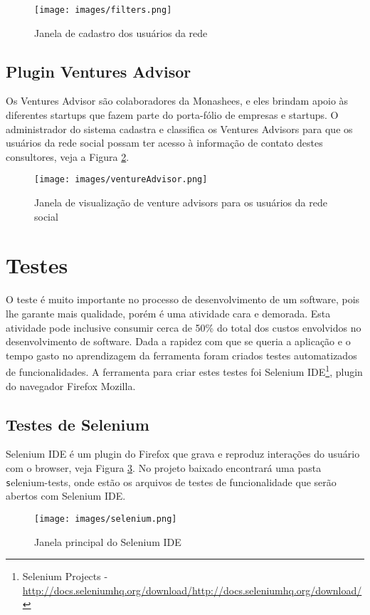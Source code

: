 \documentclass[12pt, letterpaper, onecolumn]{article}
\begin{document}
\begin{figure}[htpb]
\centering
\texttt{[image: images/filters.png]}
\caption{Janela de cadastro dos usuários da rede}
\label{fig:filters}
\end{figure}

\subsection{Plugin Ventures Advisor}
Os Ventures Advisor são colaboradores da Monashees, e eles brindam apoio às diferentes startups que fazem parte do porta-fólio de empresas e startups. O administrador do sistema cadastra e classifica os Ventures Advisors para que os usuários da rede social possam ter acesso à informação de contato destes consultores, veja a Figura \ref{fig:VA}.

\begin{figure}[htpb]
\centering
\texttt{[image: images/ventureAdvisor.png]}
\caption{Janela de visualização de venture advisors para os usuários da rede social}
\label{fig:VA}
\end{figure}

\section{Testes}
O teste é muito importante no processo de desenvolvimento de um software, pois lhe garante mais qualidade, porém é uma atividade cara e demorada. Esta atividade pode inclusive consumir cerca de 50\% do total dos custos envolvidos no desenvolvimento de software. Dada a rapidez com que se queria a aplicação e o tempo gasto no aprendizagem da ferramenta foram criados testes automatizados de funcionalidades. A ferramenta para criar estes testes foi Selenium IDE\footnote{Selenium Projects - \url{http://docs.seleniumhq.org/download/http://docs.seleniumhq.org/download/}}, plugin do navegador Firefox Mozilla.

\subsection{Testes de Selenium}
Selenium IDE é um plugin do Firefox que grava e reproduz interações do usuário com o browser, veja Figura \ref{fig:Selenium}. No projeto baixado encontrará uma pasta {\texttt selenium-tests}, onde estão os arquivos de testes de funcionalidade que serão abertos com Selenium IDE.

\begin{figure}[htpb]
\centering
\texttt{[image: images/selenium.png]}
\caption{Janela principal do Selenium IDE}
\label{fig:Selenium}
\end{figure}
\end{document}
